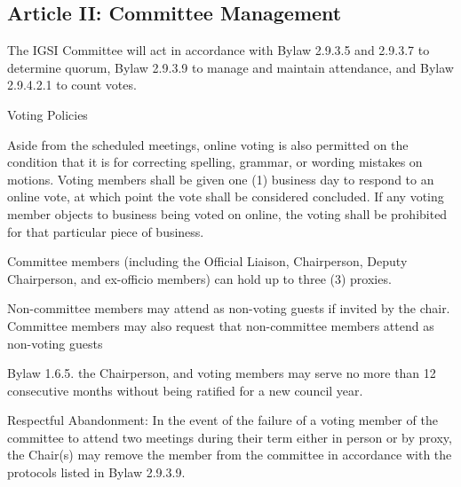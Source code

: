 \subsection{Article II: Committee Management}
\begin{longenum}[ label*=\thesubsection.\arabic*., align=left] 
\item The IGSI Committee will act in accordance with Bylaw 2.9.3.5 and 2.9.3.7 to determine quorum, Bylaw 2.9.3.9 to manage and maintain attendance, and Bylaw 2.9.4.2.1 to count votes.
\item Voting Policies
	\begin{longenum}[ label*=\arabic*., align=left]
	\item Aside from the scheduled meetings, online voting is also permitted on the condition that it is for correcting spelling, grammar, or wording mistakes on motions. Voting members shall be given one (1) business day to respond to an online vote, at which point the vote shall be considered concluded. If any voting member objects to business being voted on online, the voting shall be prohibited for that particular piece of business.
	\item Committee members (including the Official Liaison, Chairperson, Deputy Chairperson, and ex-officio members) can hold up to three (3) proxies.
	\end{longenum}
\item Non-committee members may attend as non-voting guests if invited by the chair. Committee members may also request that non-committee members attend as non-voting guests
\item Bylaw 1.6.5. the Chairperson, and voting members may serve no more than 12 consecutive months without being ratified for a new council year.
\item Respectful Abandonment: In the event of the failure of a voting member of the committee to attend two meetings during their term either in person or by proxy, the Chair(s) may remove the member from the committee in accordance with the protocols listed in Bylaw 2.9.3.9.
\end{longenum}

